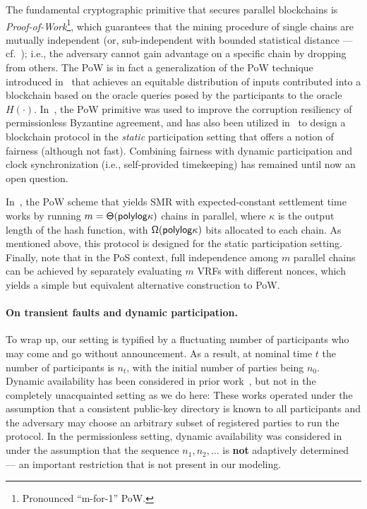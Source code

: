 The fundamental cryptographic primitive that secures parallel blockchains is \emph{\mforone Proof-of-Work}\footnote{Pronounced ``m-for-1'' PoW.}, which guarantees that the mining procedure of single chains are mutually independent (or, sub-independent with bounded statistical distance --- cf.~\cite{TCC:FGKR20}); i.e., the adversary cannot gain advantage on a specific chain by dropping from others.
%
The \mforone PoW is in fact a generalization of the \twoforone PoW technique introduced in~\cite{EC:GarKiaLeo15} that achieves an equitable distribution of inputs contributed into a blockchain based on the oracle queries posed by the participants to the oracle $H(\cdot)$.
%
In~\cite{EC:GarKiaLeo15}, the \twoforone PoW primitive was used to improve the corruption resiliency of permissionless Byzantine agreement, and has also been utilized in~\cite{PODC:PasShi17} to design a blockchain protocol in the \emph{static} participation setting that offers a notion of fairness
(although not fast).
%
Combining fairness with dynamic participation and clock synchronization (i.e., self-provided timekeeping) has remained until now an open question.

In~\cite{EC:GarKiaShe24}, the \mforone PoW scheme that yields SMR with expected-constant settlement time works by running $m = \mathsf{\Theta}(\mathsf{polylog} \kappa)$ chains in parallel, where $\kappa$ is the output length of the hash function, with $\mathsf{\Omega}(\mathsf{polylog} \kappa)$ bits allocated to each chain.
%
As mentioned above, this protocol is designed for the static participation setting.
%
Finally, note that in the PoS context, full independence among $m$ parallel chains can be achieved by separately evaluating $m$ VRFs with different nonces, which yields a simple but equivalent alternative construction to \mforone PoW.

\paragraph{On transient faults and dynamic participation.}
%
To wrap up, our setting is typified by a fluctuating number of participants who may come and go without announcement.
%
As a result, at nominal time $t$ the number of participants is $n_t$, with the initial number of parties being $n_0$.
%
Dynamic availability has been considered in prior work~\cite{AC:PasShi17,CCS:BGKRZ18}, but not in the completely unacquainted setting as we do here:
%
These works operated under the assumption that a consistent public-key directory is known to all participants and the adversary may choose an arbitrary subset of registered parties to run the protocol.
%
In the permissionless setting, dynamic availability was considered in~\cite{C:GarKiaLeo17} under the assumption that the sequence $n_1,n_2, \ldots$ is \textbf{not} adaptively determined --- an important restriction that is not present in our modeling.
